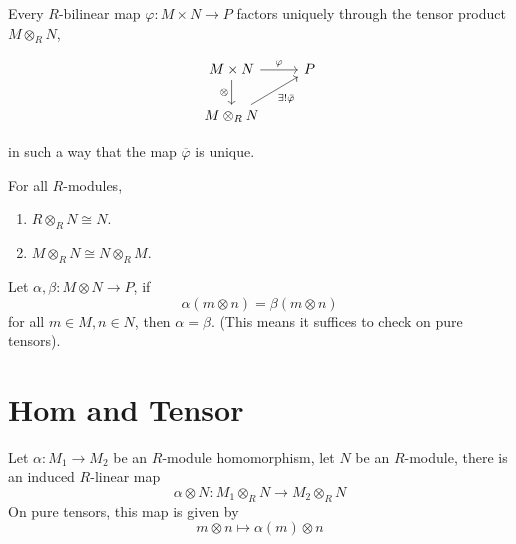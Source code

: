 \documentclass[openany]{book}
\begin{document}
\begin{prop}
    Every $R$-bilinear map $\varphi: M \times N \to P$ factors uniquely through the tensor product $M \otimes_R N$,
\begin{center}
    \[\begin{tikzcd}
        {M\times N} & P \\
        {M\otimes_RN}
        \arrow["\varphi", from=1-1, to=1-2]
        \arrow["\otimes"', from=1-1, to=2-1]
        \arrow["{\exists!\bar{\varphi}}"', from=2-1, to=1-2]
    \end{tikzcd}\]
\end{center}
in such a way that the map $\overline{\varphi}$ is unique.
\end{prop}
\begin{example}
    For all $R$-modules, 
    \begin{enumerate}
        \item $R\otimes_RN\cong N$.
        \item $M\otimes_RN\cong N\otimes_RM$.
    \end{enumerate}
\end{example}

\begin{prop}
    Let $\alpha,\beta:M\otimes N\to P$, if 
    \begin{equation*}
        \alpha(m\otimes n)=\beta(m\otimes n)
    \end{equation*}
    for all $m\in M, n\in N$, then $\alpha=\beta$. (This means it suffices to check on pure tensors).
\end{prop}



\section{Hom and Tensor}


\begin{prop}
    Let $\alpha:M_1\to M_2$ be an $R$-module homomorphism, let $N$ be an $R$-module, there is an induced $R$-linear map 
    \begin{equation*}
        \alpha\otimes N: M_1\otimes_R N\to M_2\otimes_R N
    \end{equation*}
    On pure tensors, this map is given by 
    \begin{equation*}
        m\otimes n\mapsto \alpha(m)\otimes n
    \end{equation*}

\end{prop}
\end{document}
